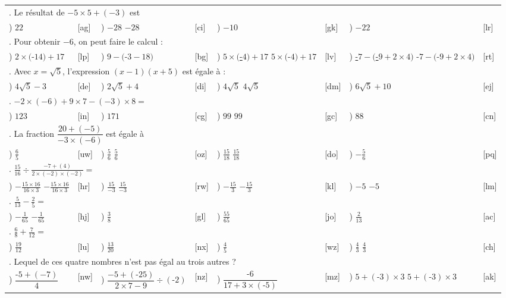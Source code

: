 \documentclass[
	classe=$2^{de}$,
	exercices=Exercices\space chapitre\space 1
]{exercice}
\newcounter{QCMQuestionCounter}
\newcounter{QCMReponseCounter}
\newcommand{\QCMQuestion}[1]{
	\hline\multicolumn{8}{l}{\arabic{QCMQuestionCounter}. #1}\stepcounter{QCMQuestionCounter} \\
}
\newcommand{\QCMReponse}[8]{
	\setcounter{QCMReponseCounter}{1}         \alph{QCMReponseCounter}) #1 & [#2] & \stepcounter{QCMReponseCounter}           \alph{QCMReponseCounter}) #3 & [#4] & \stepcounter{QCMReponseCounter}           \alph{QCMReponseCounter}) #5 & [#6] & \stepcounter{QCMReponseCounter}           \alph{QCMReponseCounter}) #7 & [#8] \\
}
\newcommand{\QCMJuste}[1]{
\ifdefined\makeCorrection
\uline{#1}
\else
#1
\fi
}
\begin{document}
\begin{tabular}{llllllll}
	\QCMQuestion{Le résultat de $-5 × 5 + (-3)$ est}
	\QCMReponse{$22$}{ag}{\QCMJuste{$-28$}}{ci}{$-10$}{gk}{$-22$}{lr}
	\QCMQuestion{Pour obtenir $-6$, on peut faire le calcul :}
	\QCMReponse{$2 × ($-$14) + 17$}{lp}{$9 - ($-$3 - 18)$}{bg}{\QCMJuste{$5 × ($-$4) + 17$}}{lv}{\QCMJuste{-$7 - ($-$9 + 2 × 4)$}}{rt}
	\QCMQuestion{Avec $x=\sqrt{5}$, l'expression $(x-1)(x+5)$ est égale à :}
	\QCMReponse{$4\sqrt{5} - 3$}{de}{$2\sqrt{5} + 4$}{di}{\QCMJuste{$4\sqrt{5}$}}{dm}{$6\sqrt{5} + 10$}{ej}
	\QCMQuestion{$-2 × (-6) + 9 × 7 - (-3) × 8 =$}
	\QCMReponse{$123$}{in}{$171$}{cg}{\QCMJuste{$99$}}{gc}{$88$}{cn}
	\QCMQuestion{La fraction $\dfrac{20 + (-5)}{-3 × (-6)}$ est égale à}
	\QCMReponse{$\frac{6}{5}$}{uw}{\QCMJuste{$\frac{5}{6}$}}{oz}{\QCMJuste{$\frac{15}{18}$}}{do}{$-\frac{5}{6}$}{pq}
	\QCMQuestion{$\frac{15}{16} ÷ \frac{-7 + (4)}{2 × (-2) × (-2)} =$}
	\QCMReponse{\QCMJuste{$-\frac{15 × 16}{16 × 3}$}}{hr}{\QCMJuste{$\frac{15}{-3}$}}{rw}{\QCMJuste{$-\frac{15}{3}$}}{kl}{\QCMJuste{$-5$}}{lm}
	\QCMQuestion{$\frac{5}{13}-\frac{2}{5} =$}
	\QCMReponse{\QCMJuste{$-\frac{1}{65}$}}{hj}{$\frac{3}{8}$}{gl}{$\frac{55}{65}$}{jo}{$\frac{2}{13}$}{ac}
	\QCMQuestion{$\frac{6}{8} + \frac{7}{12} =$}
	\QCMReponse{$\frac{19}{12}$}{lu}{$\frac{13}{20}$}{nx}{$\frac{4}{5}$}{wz}{\QCMJuste{$\frac{4}{3}$}}{ch}
	\QCMQuestion{Lequel de ces quatre nombres n'est pas égal au trois autres ?}
	\QCMReponse{$\dfrac{\text{-}5 + (-7)}{4}$}{nw}{$\dfrac{-5 + (\text{-}25)}{2 × 7 - 9} ÷ (\text{-}2)$}{nz}{$\dfrac{\text{-}6}{17 + 3 × (\text{-}5)}$}{mz}{\QCMJuste{$5 + (\text{-}3) × 3$}}{ak}
\end{tabular}
\end{document}
